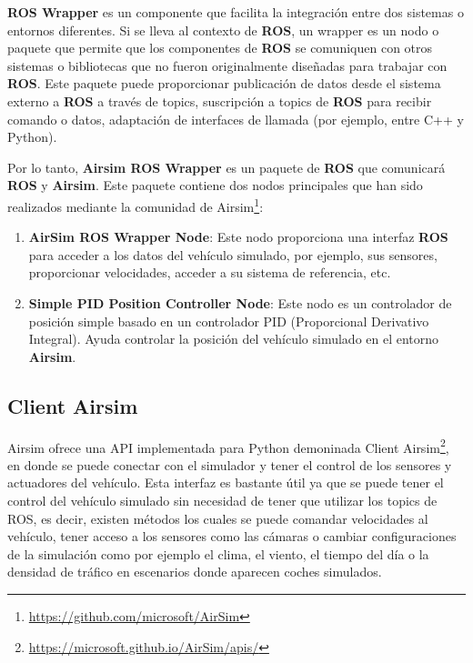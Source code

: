 \textbf{ROS Wrapper} es un componente que facilita la integración entre dos sistemas o entornos diferentes. Si se lleva al contexto de \textbf{ROS}, un wrapper es un nodo o paquete 
que permite que los componentes de \textbf{ROS} se comuniquen con otros sistemas o bibliotecas que no fueron originalmente diseñadas para trabajar con \textbf{ROS}. Este paquete 
puede proporcionar publicación de datos desde el sistema externo a \textbf{ROS} a través de topics, suscripción a topics de \textbf{ROS} para recibir comando o datos, adaptación 
de interfaces de llamada (por ejemplo, entre C++ y Python). 

Por lo tanto, \textbf{Airsim ROS Wrapper} es un paquete de \textbf{ROS} que comunicará \textbf{ROS} y \textbf{Airsim}. Este paquete contiene dos nodos principales 
que han sido realizados mediante la comunidad de Airsim\footnote{\url{https://github.com/microsoft/AirSim}}:
\begin{enumerate}
  \item \textbf{AirSim ROS Wrapper Node}: Este nodo proporciona una interfaz \textbf{ROS} para acceder a los datos del vehículo simulado, por ejemplo, sus sensores, proporcionar velocidades, acceder a su sistema de referencia, etc. 
  \item \textbf{Simple PID Position Controller Node}: Este nodo es un controlador de posición simple basado en un controlador PID (Proporcional Derivativo Integral). Ayuda controlar la posición del vehículo 
  simulado en el entorno \textbf{Airsim}.
\end{enumerate}

\subsection{Client Airsim}
\label{sec:Client Airsim}

Airsim ofrece una API implementada para Python demoninada Client Airsim\footnote{\url{https://microsoft.github.io/AirSim/apis/}}, en donde se puede conectar con el simulador y tener el control de los sensores y actuadores del vehículo. 
Esta interfaz es bastante útil ya que se puede tener el control del vehículo simulado sin necesidad de tener que utilizar los topics de ROS, es decir, existen métodos los cuales
se puede comandar velocidades al vehículo, tener acceso a los sensores como las cámaras o cambiar configuraciones de la simulación como por ejemplo el clima, el viento, el tiempo del día
o la densidad de tráfico en escenarios donde aparecen coches simulados. 

